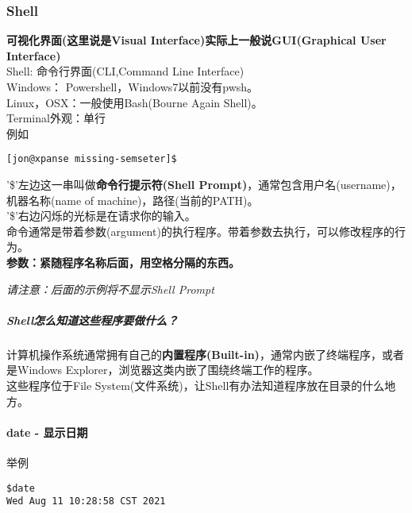 \documentclass[
]{article}
\author{}
\date{}
\begin{document}
\hypertarget{shell}{%
\subsubsection{Shell}\label{shell}}

\textbf{可视化界面(这里说是Visual Interface)实际上一般说GUI(Graphical
User Interface)}\\
Shell: 命令行界面(CLI,Command Line Interface)\\
Windows： Powershell，Windows7以前没有pwsh。\\
Linux，OSX：一般使用Bash(Bourne Again Shell)。\\
Terminal外观：单行\\
例如

\begin{verbatim}
[jon@xpanse missing-semseter]$
\end{verbatim}

'\$'左边这一串叫做\textbf{命令行提示符(Shell
Prompt)}，通常包含用户名(username)，机器名称(name of
machine)，路径(当前的PATH)。\\
'\$'右边闪烁的光标是在请求你的输入。\\
命令通常是带着参数(argument)的执行程序。带着参数去执行，可以修改程序的行为。\\
\textbf{参数：紧随程序名称后面，用空格分隔的东西。}

\emph{请注意：后面的示例将不显示Shell Prompt}

\hypertarget{shellux600eux4e48ux77e5ux9053ux8fd9ux4e9bux7a0bux5e8fux8981ux505aux4ec0ux4e48}{%
\subparagraph{Shell怎么知道这些程序要做什么？}\label{shellux600eux4e48ux77e5ux9053ux8fd9ux4e9bux7a0bux5e8fux8981ux505aux4ec0ux4e48}}

计算机操作系统通常拥有自己的\textbf{内置程序(Built-in)}，通常内嵌了终端程序，或者是Windows
Explorer，浏览器这类内嵌了围绕终端工作的程序。\\
这些程序位于File
System(文件系统)，让Shell有办法知道程序放在目录的什么地方。

\hypertarget{date---ux663eux793aux65e5ux671f}{%
\paragraph{date - 显示日期}\label{date---ux663eux793aux65e5ux671f}}

举例

\begin{verbatim}
$date
Wed Aug 11 10:28:58 CST 2021
\end{verbatim}
\end{document}
